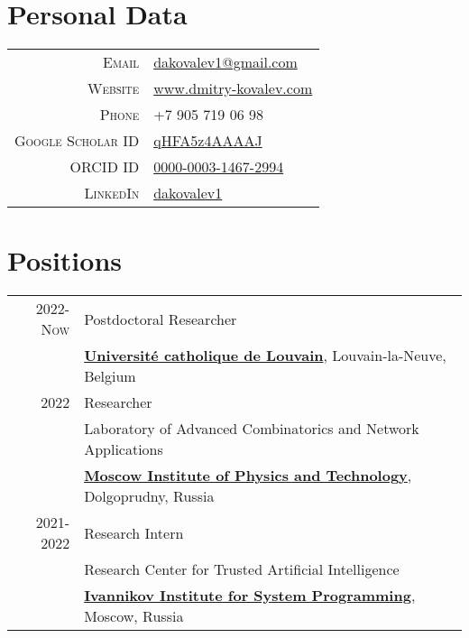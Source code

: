\section{Personal Data}

\begin{tabular}{rl}
	\textsc{Email} & \href{mailto:dakovalev1@gmail.com}{dakovalev1@gmail.com}\\
	\textsc{Website} & \href{https://www.dmitry-kovalev.com}{www.dmitry-kovalev.com}\\
	\textsc{Phone} & +7 905 719 06 98\\
	\textsc{Google Scholar ID} &\href{https://scholar.google.com/citations?user=qHFA5z4AAAAJ}{qHFA5z4AAAAJ}\\
	\textsc{ORCID ID} & \href{https://orcid.org/0000-0003-1467-2994}{0000-0003-1467-2994}\\
	\textsc{LinkedIn} & \href{https://www.linkedin.com/in/dakovalev1/}{dakovalev1}
\end{tabular}



\section{Positions}
\begin{tabular}{rl}	
	\textsc{2022-Now}& Postdoctoral Researcher\\
	& \textbf{\href{https://uclouvain.be/en/index.html}{\color{black}Université catholique de Louvain}}, Louvain-la-Neuve, Belgium\\
	\textsc{2022}& Researcher\\
	&Laboratory of Advanced Combinatorics and Network Applications\\
	&\textbf{\href{https://mipt.ru/}{\color{black}Moscow Institute of Physics and Technology}}, Dolgoprudny, Russia\\
	\textsc{2021-2022}& Research Intern\\
	 &Research Center for Trusted Artificial Intelligence\\
	 &\textbf{\href{https://www.ispras.ru/en/}{\color{black}Ivannikov Institute for System Programming}}, Moscow, Russia
\end{tabular}



